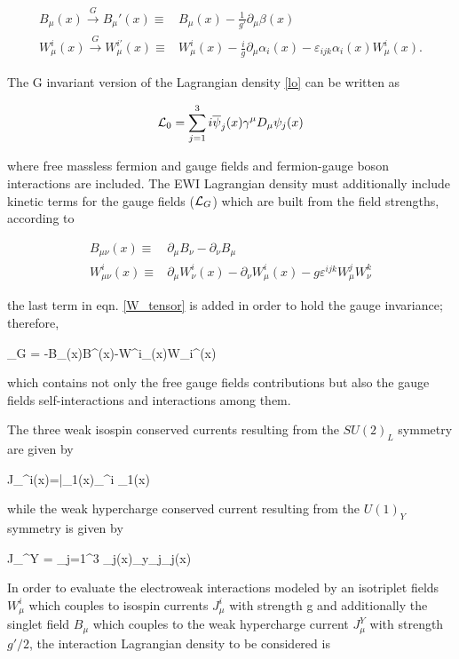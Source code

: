 \begin{align}\label{f_transf}
B_\mu(x) \xrightarrow[]{G} B_\mu'(x)\equiv & B_\mu(x)
- \frac{1}{g'}\partial_\mu\beta(x) \nonumber\\
W^i_\mu(x) \xrightarrow[]{G} W_\mu^{i\prime}(x)\equiv & W^i_\mu(x) - \frac{i}{g}\partial_\mu \alpha_i(x) - \varepsilon_{ijk}\alpha_i(x)W^i_\mu(x).
\end{align}

\noindent The G invariant version of the Lagrangian density \ref{lo} can be written as

\begin{equation}\label{linv}
\mathcal{L}_0 = \sum_{j=1}^3 i\overline{\psi}_j(x)\gamma^\mu D_\mu \psi_j(x)
\end{equation}

\noindent where free massless fermion and gauge fields and fermion-gauge boson interactions are included. The EWI Lagrangian density must additionally include kinetic terms for the gauge fields ($\mathcal{L}_G$) which are built from the field strengths, according to

\begin{align}
B_{\mu\nu}(x)   \equiv & \partial_\mu B_\nu -  \partial_\nu B_\mu \label{B_tensor} \\ 
W^i_{\mu\nu}(x) \equiv & \partial_\mu W^i_\nu(x) - \partial_\nu W^i_\mu(x) - g\varepsilon^{ijk}W^j_\mu W^k_\nu \label{W_tensor}
\end{align}

\noindent the last term in eqn. \ref{W_tensor} is added in order to hold the gauge invariance; therefore,

\beqn\label{lg}
\Lagr_G = -B_{\mu\nu}(x)B^{\mu\nu}(x)-W^i_{\mu\nu}(x)W_i^{\mu\nu}(x)
\eeqn

\noindent which contains not only the free gauge fields contributions but also the gauge fields self-interactions and interactions among them.  

\noindent The three weak isospin conserved currents resulting from the $SU(2)_L$ symmetry are given by

\beqn
J_\mu^i(x)=\bar{\psi_1}(x)\gamma_\mu \sigma^i \psi_1(x) 
\eeqn

\noindent while the weak hypercharge conserved current resulting from the $U(1)_Y$ symmetry is given by 

\beqn
J_\mu^Y = \sum_{j=1}^3 \overline{\psi}_j(x)\gamma_\mu y_j\psi_j(x)
\eeqn

\noindent In order to evaluate the electroweak interactions modeled by an isotriplet fields $W^i_\mu$ which couples to isospin currents $J^i_\mu$ with strength g and additionally the singlet field $B_\mu$ which couples to the weak hypercharge current $J_\mu^Y$ with strength $g'/2$, the interaction Lagrangian density to be considered is

